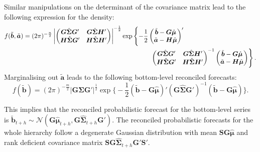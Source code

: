 \documentclass[12pt]{article}
\def\PQ{\begin{pmatrix}\bm{G}\\[-0.2cm]\bm{H}\end{pmatrix}}
\theoremstyle{definition}
\begin{document}

Similar manipulations on the determinant of the covariance matrix lead to the following expression for the density:
\begin{align*}
f(\tilde{\bm{b}},\tilde{\bm{a}})&
=(2\pi)^{-\frac{n}{2}}\left|
\begin{pmatrix}
  \bm{G}\hat{\bm{\Sigma}}\bm{G}' & \bm{G}\hat{\bm{\Sigma}}\bm{H}' \\
  \bm{H}\hat{\bm{\Sigma}}\bm{G}' & \bm{H}\hat{\bm{\Sigma}}\bm{H}'
\end{pmatrix}
\right|^{-\frac{1}{2}}
\exp \left\{-\frac{1}{2} \begin{pmatrix}\tilde{\bm{b}} - \bm{G}\hat{\bm{\mu}}\\ \tilde{\bm{a}}- \bm{H}\hat{\bm{\mu}}\end{pmatrix}'\right.\\
&\hspace*{7cm}
\left.\begin{pmatrix}
\bm{G}\hat{\bm{\Sigma}}\bm{G}' & \bm{G}\hat{\bm{\Sigma}}\bm{H}' \\
\bm{H}\hat{\bm{\Sigma}}\bm{G}' & \bm{H}\hat{\bm{\Sigma}}\bm{H}'
\end{pmatrix}^{-1}
\begin{pmatrix}\tilde{\bm{b}} - \bm{G}\hat{\bm{\mu}}\\ \tilde{\bm{a}}- \bm{H}\hat{\bm{\mu}}\end{pmatrix} \right\}.
\end{align*}
Marginalising out $\tilde{\bm{a}}$ leads to the following bottom-level reconciled forecasts:
\begin{equation}\label{ex:2.1}
f(\tilde{\bm{b}})=(2\pi)^{-\frac{m}{2}}\Big|\bm{G}\hat{\bm{\Sigma}}\bm{G}'\Big|^{\frac{1}{2}}
\exp \Big\{-\frac{1}{2} (\tilde{\bm{b}} - \bm{G}\hat{\bm{\mu}})' (\bm{G}\hat{\bm{\Sigma}}\bm{G}')^{-1}(\tilde{\bm{b}} - \bm{G}\hat{\bm{\mu}}) \Big\}.
\end{equation}

This implies that the reconciled probabilistic forecast for the bottom-level series is $\tilde{\bm{b}}_{t+h} \sim \mathcal{N}(\bm{G}\hat{\bm{\mu}}_{t+h}, \bm{G}\hat{\bm{\Sigma}}_{t+h}\bm{G}')$. The reconciled probabilistic forecasts for the whole hierarchy follow a degenerate Gaussian distribution with mean $\bm{SG}\hat{\bm{\mu}}$ and rank deficient covariance matrix $\bm{SG}\hat{\bm{\Sigma}}_{t+h}\bm{G}'\bm{S}'$.
\end{document}

